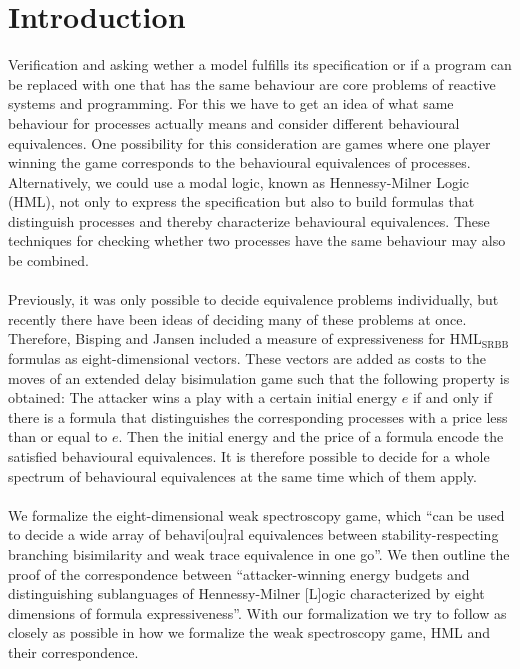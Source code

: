 \newpage
\section{Introduction} 
Verification and asking wether a model fulfills its specification or if a program can be replaced with one that has the same behaviour are core problems of reactive systems and programming.
For this we have to get an idea of what same behaviour for processes actually means and consider different behavioural equivalences.
One possibility for this consideration are games where one player winning the game corresponds to the behavioural equivalences of processes.
Alternatively, we could use a modal logic, known as Hennessy-Milner Logic (HML), not only to express the specification but also to build formulas that distinguish processes and 
thereby characterize behavioural equivalences.
These techniques for checking whether two processes have the same behaviour may also be combined.
\\\\
Previously, it was only possible to decide equivalence problems individually, but recently there have been ideas of deciding many of these problems at once.
Therefore, Bisping and Jansen \cite{bisping2023lineartimebranchingtime} included a measure of expressiveness for HML$_\text{{SRBB}}$ formulas as eight-dimensional vectors.
These vectors are added as costs to the moves of an extended delay bisimulation game such that the following property is obtained: 
The attacker wins a play with a certain initial energy $e$ if and only if there is a formula that distinguishes the corresponding processes with a price less than or equal to $e$.
Then the initial energy and the price of a formula encode the satisfied behavioural equivalences.
It is therefore possible to decide for a whole spectrum of behavioural equivalences at the same time which of them apply.
\\\\
We formalize the eight-dimensional weak spectroscopy game, 
which ``can be used to decide a wide array of behavi[ou]ral equivalences between stability-respecting branching bisimilarity and weak trace equivalence in one go''\cite[Abstract]{bisping2023lineartimebranchingtime}.
We then outline the proof of the correspondence between ``attacker-winning energy budgets and distinguishing sublanguages of Hennessy-Milner [L]ogic characterized by eight dimensions of formula expressiveness''\cite[Abstract]{bisping2023lineartimebranchingtime}.
With our formalization we try to follow \cite{bisping2023lineartimebranchingtime} as closely as possible in how we formalize the weak spectroscopy game, HML and their correspondence.
